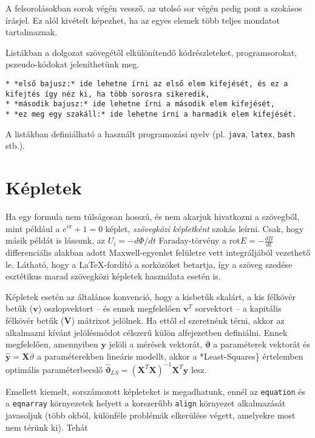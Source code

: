 \documentclass[11pt,magyar,a4paper,oneside,]{report}
\begin{document}
A felsorolásokban sorok végén vessző, az utolsó sor végén pedig pont a
szokásos írásjel. Ez alól kivételt képezhet, ha az egyes elemek több
teljes mondatot tartalmaznak.

Listákban a dolgozat szövegétől elkülönítendő kódrészleteket,
programsorokat, pszeudo-kódokat jeleníthetünk meg.

\begin{verbatim}
* *első bajusz:* ide lehetne írni az első elem kifejését, és ez a kifejtés így néz ki, ha több sorosra sikeredik,
* *második bajusz:* ide lehetne írni a második elem kifejését,
* *ez meg egy szakáll:* ide lehetne írni a harmadik elem kifejését.
\end{verbatim}

A listákban definiálható a használt programozási nyelv (pl.
\texttt{java}, \texttt{latex}, \texttt{bash} stb.).

\section{Képletek}\label{kuxe9pletek}

Ha egy formula nem túlságosan hosszú, és nem akarjuk hivatkozni a
szövegből, mint például a $e^{i\pi}+1=0$ képlet, \emph{szövegközi
képletként} szokás leírni. Csak, hogy másik példát is lássunk, az
$U_i=-d\Phi/dt$ Faraday-törvény a $\mathrm{rot} E=-\frac{dB}{dt}$
differenciális alakban adott Maxwell-egyenlet felületre vett
integráljából vezethető le. Látható, hogy a \LaTeX-fordító a sorközöket
betartja, így a szöveg szedése esztétikus marad szövegközi képletek
használata esetén is.

Képletek esetén az általános konvenció, hogy a kisbetűk skalárt, a kis
félkövér betűk ($\mathbf{v}$) oszlopvektort -- és ennek megfelelően
$\mathbf{v}^T$ sorvektort -- a kapitális félkövér betűk ($\mathbf{V}$)
mátrixot jelölnek. Ha ettől el szeretnénk térni, akkor az alkalmazni
kívánt jelölésmódot célszerű külön alfejezetben definiálni. Ennek
megfelelően, amennyiben $\mathbf{y}$ jelöli a mérések vektorát,
$\mathbf{\vartheta}$ a paraméterek vektorát és
$\hat{\mathbf{y}}=\mathbf{X}\vartheta$ a paraméterekben lineáris
modellt, akkor a *Least-Squares\} értelemben optimális paraméterbecslő
$\hat{\mathbf{\vartheta}}_{LS}=(\mathbf{X}^T\mathbf{X})^{-1}\mathbf{X}^T\mathbf{y}$
lesz.

Emellett kiemelt, sorszámozott képleteket is megadhatunk, ennél az
\texttt{equation} és a \texttt{eqnarray} környezetek helyett a
korszerűbb \texttt{align} környezet alkalmazását javasoljuk (több okból,
különféle problémák elkerülése végett, amelyekre most nem térünk ki).
Tehát
\end{document}
